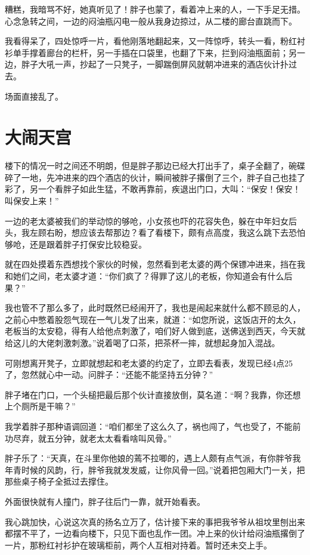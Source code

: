 糟糕，我暗骂不好，她真听见了！胖子也蒙了，看着冲上来的人，一下手足无措。心念急转之间，一边的闷油瓶闪电一般从我身边掠过，从二楼的廊台直跳而下。

我看得呆了，四处惊呼一片，看他刚落地翻起来，又一阵惊呼，转头一看，粉红衬衫单手撑着廊台的栏杆，另一手插在口袋里，也翻了下来，拦到闷油瓶面前；另一边，胖子大吼一声，抄起了一只凳子，一脚踹倒屏风就朝冲进来的酒店伙计扑过去。

场面直接乱了。

\chapter{大闹天宫}

楼下的情况一时之间还不明朗，但是胖子那边已经大打出手了，桌子全翻了，碗碟碎了一地，先冲进来的四个酒店的伙计，瞬间被胖子撂倒了三个，胖子自己也挂了彩了，另一个看胖子如此生猛，不敢再靠前，疾退出门口，大叫：“保安！保安！叫保安上来！”

一边的老太婆被我们的举动惊的够呛，小女孩也吓的花容失色，躲在中年妇女后头，我左顾右盼，想应该去帮那边？看了看楼下，颇有点高度，我这么跳下去恐怕够呛，还是跟着胖子打保安比较稳妥。

就在四处摸着东西想找个家伙的时候，忽然看到老太婆的两个保镖冲进来，挡在我和她们之间，老太婆才道：“你们疯了？得罪了这儿的老板，你知道会有什么后果？”

我也管不了那么多了，此时既然已经闹开了，我也是闹起来就什么都不顾忌的人，之前心中憋着股怨气现在一气儿发了出来，就道：“如您所说，这饭店开的太久，老板当的太安稳，得有人给他点刺激了，咱们好人做到底，送佛送到西天，今天就给这儿的大佬刺激刺激。”说着喝了口茶，把茶杯一摔，就想起身加入混战。

可刚想离开凳子，立即就想起和老太婆的约定了，立即去看表，发现已经4点25了，忽然就心中一动。问胖子：“还能不能坚持五分钟？”

胖子堵在门口，一个头槌把最后那个伙计直接放倒，莫名道：“啊？我靠，你还想上个厕所是干嘛？”

我学着胖子那种语调回道：“咱们都坐了这么久了，祸也闯了，气也受了，不能前功尽弃，就五分钟，就老太太看看啥叫风骨。”

胖子乐了：“天真，在斗里你他娘的蔫不拉唧的，遇上人颇有点气派，有你胖爷我年青时候的风韵，行，胖爷我就发发威，让你风骨一回。”说着把包厢大门一关，把那些桌子椅子全抵过去撑住。

外面很快就有人撞门，胖子往后门一靠，就开始看表。

我心跳加快，心说这次真的扬名立万了，估计接下来的事把我爷爷从祖坟里刨出来都摆不平了，一边看向楼下，只见下面也乱作一团。冲上来的伙计给闷油瓶撂倒了一片，那粉红衬衫护在玻璃柜前，两个人互相对持着。暂时还未交上手。

